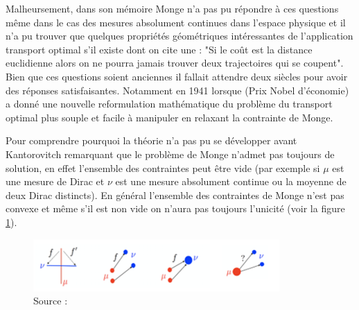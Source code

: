 \documentclass[
    8.2pt,
    a4paper,
    logo,
    twocolumn
]{template}
\begin{document}
    Malheursement, dans son mémoire Monge n’a pas pu répondre à ces questions même dans le cas des mesures absolument continues dans l’espace physique et il n'a pu trouver que quelques propriétés géométriques intéressantes de l’application transport optimal s’il existe dont on cite une : "Si le coût est la distance euclidienne alors on ne pourra jamais trouver deux trajectoires qui se coupent". Bien que ces questions soient anciennes il fallait attendre deux siècles pour avoir des réponses satisfaisantes. Notamment en 1941 lorsque \citet{kantorovitch_translocation_1958} (Prix Nobel d’économie) a donné une nouvelle reformulation mathématique du problème du transport optimal plus souple et facile à manipuler en relaxant la contrainte de Monge.

    Pour comprendre pourquoi la théorie n’a pas pu se développer avant Kantorovitch remarquant que le problème de Monge n’admet pas toujours de solution, en effet l’ensemble des contraintes peut être vide (par exemple si $\mu$ est une mesure de Dirac et $\nu$ est une mesure absolument continue ou la moyenne de deux Dirac distincts). En général l’ensemble des contraintes de Monge n’est pas convexe et même s’il est non vide on n’aura pas toujours l’unicité (voir la figure \ref{fig:figure}).
    \begin{figure}[H]
        \centering
        \includegraphics[width=.5\textwidth]{figures/Image3.png}
        \caption{Source : \citep{flamary_optimal_nodate}}
        \label{fig:figure}
    \end{figure}
\end{document}
